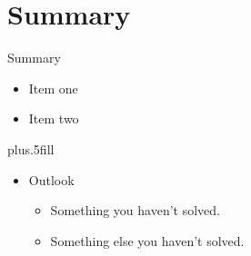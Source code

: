 \documentclass{beamer}
\begin{document}
\section{Summary}

\begin{frame}{Summary}

  \begin{itemize}
  \item
    Item one
  \item
    Item two
  \end{itemize}
  
  \vskip0pt plus.5fill
  \begin{itemize}
  \item
    Outlook
    \begin{itemize}
    \item
      Something you haven't solved.
    \item
      Something else you haven't solved.
    \end{itemize}
  \end{itemize}
\end{frame}
\end{document}
